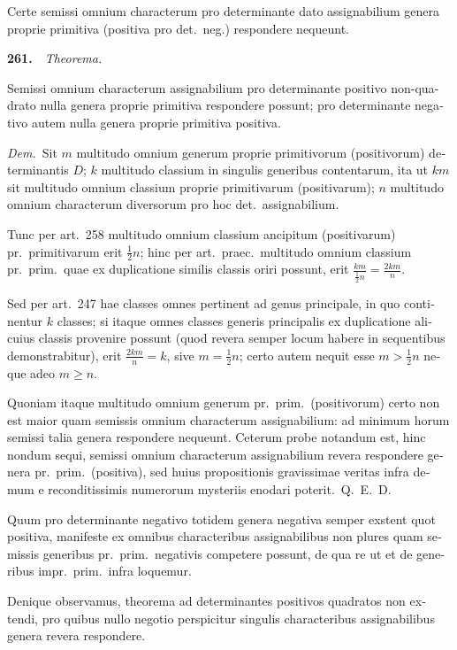 \documentclass[12pt,a4paper]{article}
\theoremstyle{plain}
\theoremstyle{definition}
\theoremstyle{remark}
\begin{document}
\begin{otherlanguage}{latin}
Certe semissi omnium characterum pro determinante dato assignabilium genera proprie primitiva (positiva pro det.\ neg.) respondere nequeunt.

\bigskip

\textbf{261.}\ \ \textit{Theorema.}

Semissi omnium characterum assignabilium pro determinante positivo non-quadrato nulla genera proprie primitiva respondere possunt; pro determinante negativo autem nulla genera proprie primitiva positiva.

\smallskip

\textit{Dem.}\ Sit $m$ multitudo omnium generum proprie primitivorum (positivorum) determinantis $D$; $k$ multitudo classium in singulis generibus contentarum, ita ut $km$ sit multitudo omnium classium proprie primitivarum (positivarum); $n$ multitudo omnium characterum diversorum pro hoc det.\ assignabilium.

Tunc per art.\ 258 multitudo omnium classium ancipitum (positivarum) pr.\ primitivarum erit $\frac{1}{2}n$; hinc per art.\ praec.\ multitudo omnium classium pr.\ prim.\ quae ex duplicatione similis classis oriri possunt, erit $\frac{km}{\frac{1}{2}n} = \frac{2km}{n}$.

Sed per art.\ 247 hae classes omnes pertinent ad genus principale, in quo continentur $k$ classes; si itaque omnes classes generis principalis ex duplicatione alicuius classis provenire possunt (quod revera semper locum habere in sequentibus demonstrabitur), erit $\frac{2km}{n} = k$, sive $m = \frac{1}{2}n$; certo autem nequit esse $m > \frac{1}{2}n$ neque adeo $m \geq n$.

Quoniam itaque multitudo omnium generum pr.\ prim.\ (positivorum) certo non est maior quam semissis omnium characterum assignabilium: ad minimum horum semissi talia genera respondere nequeunt. Ceterum probe notandum est, hinc nondum sequi, semissi omnium characterum assignabilium revera respondere genera pr.\ prim.\ (positiva), sed huius propositionis gravissimae veritas infra demum e reconditissimis numerorum mysteriis enodari poterit.~\hfill Q.\ E.\ D.

Quum pro determinante negativo totidem genera negativa semper exstent quot positiva, manifeste ex omnibus characteribus assignabilibus non plures quam semissis generibus pr.\ prim.\ negativis competere possunt, de qua re ut et de generibus impr.\ prim.\ infra loquemur.

Denique observamus, theorema ad determinantes positivos quadratos non extendi, pro quibus nullo negotio perspicitur singulis characteribus assignabilibus genera revera respondere.


\end{otherlanguage}
\end{document}
